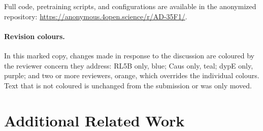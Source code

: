 \documentclass{article}
\newif\ifrevmarked \revmarkedtrue
\DeclareRobustCommand{\revA}[1]{\ifrevmarked{\color{RevA}#1}\else{#1}\fi}
\DeclareRobustCommand{\revB}[1]{\ifrevmarked{\color{RevB}#1}\else{#1}\fi}
\DeclareRobustCommand{\revC}[1]{\ifrevmarked{\color{RevC}#1}\else{#1}\fi}
\DeclareRobustCommand{\revShared}[1]{\ifrevmarked{\color{RevShared}#1}\else{#1}\fi}
\begin{document}
Full code, pretraining scripts, and configurations are available in the anonymized repository: \url{https://anonymous.4open.science/r/AD-35F1/}.




\appendix

\ifrevmarked
\paragraph{Revision colours.} In this marked copy, changes made in response to the discussion are coloured by the
reviewer concern they address: \revA{RL5B only, blue}; \revB{Caus only, teal}; \revC{dypE only, purple}; and
\revShared{two or more reviewers, orange}, which overrides the individual colours. Text that is not coloured is
unchanged from the submission or was only moved.
\fi

\section{Additional Related Work}
\label{app:related}
\end{document}
